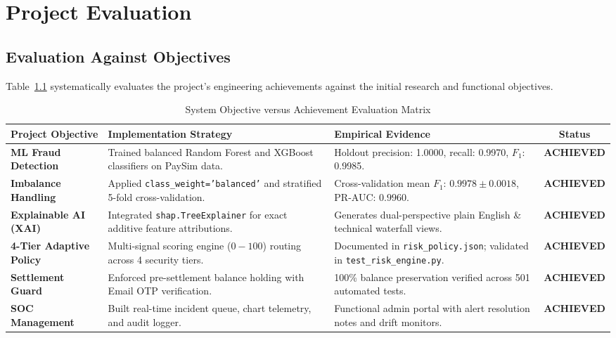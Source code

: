 \chapter{Project Evaluation}
\label{chap:evaluation}

\section{Evaluation Against Objectives}
Table~\ref{tab:objective_achievement} systematically evaluates the project's engineering achievements against the initial research and functional objectives.

\begin{table}[h]
\centering
\caption{System Objective versus Achievement Evaluation Matrix}
\label{tab:objective_achievement}
\begin{tabularx}{\textwidth}{p{3.2cm}p{3.8cm}p{4.2cm}c}
\toprule
\textbf{Project Objective} & \textbf{Implementation Strategy} & \textbf{Empirical Evidence} & \textbf{Status} \\
\midrule
\textbf{ML Fraud Detection} & Trained balanced Random Forest and XGBoost classifiers on PaySim data. & Holdout precision: 1.0000, recall: 0.9970, $F_1$: 0.9985. & \textbf{ACHIEVED} \\
\addlinespace
\textbf{Imbalance Handling} & Applied \texttt{class\_weight='balanced'} and stratified 5-fold cross-validation. & Cross-validation mean $F_1$: $0.9978 \pm 0.0018$, PR-AUC: $0.9960$. & \textbf{ACHIEVED} \\
\addlinespace
\textbf{Explainable AI (XAI)} & Integrated \texttt{shap.TreeExplainer} for exact additive feature attributions. & Generates dual-perspective plain English \& technical waterfall views. & \textbf{ACHIEVED} \\
\addlinespace
\textbf{4-Tier Adaptive Policy}& Multi-signal scoring engine ($0-100$) routing across 4 security tiers. & Documented in \texttt{risk\_policy.json}; validated in \texttt{test\_risk\_engine.py}. & \textbf{ACHIEVED} \\
\addlinespace
\textbf{Settlement Guard} & Enforced pre-settlement balance holding with Email OTP verification. & 100\% balance preservation verified across 501 automated tests. & \textbf{ACHIEVED} \\
\addlinespace
\textbf{SOC Management} & Built real-time incident queue, chart telemetry, and audit logger. & Functional admin portal with alert resolution notes and drift monitors. & \textbf{ACHIEVED} \\
\bottomrule
\end{tabularx}
\end{table}

